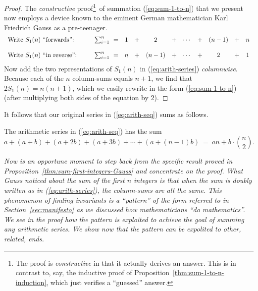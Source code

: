 \begin{proof}
The {\em constructive} proof\footnote{The proof is {\em constructive}
  in that it actually derives an answer.  This is in contrast to, say,
  the inductive proof of Proposition~\ref{thm:sum-1-to-n-induction},
  which just verifies a ``guessed'' answer.}~of summation
(\ref{eq:sum-1-to-n}) that we present now employs a device known to
the eminent German mathematician Karl Friedrich Gauss
as a pre-teenager.
\begin{equation}
\label{eq:arith-series}
\begin{array}{llccccccccc}
\mbox{Write $S_1(n)$ ``forwards'':} &
\hspace*{.25in}\sum_{i=1}^n \ = & 1 & + & 2   & + & \cdots & + & (n-1) & + & n \\
 & & & & & & & & & &  \\
\mbox{Write $S_1(n)$ ``in reverse'':} &
\hspace*{.25in}\sum_{i=1}^n \ = & n & + & (n-1) & + & \cdots & + & 2   & + & 1
\end{array}
\end{equation}
Now add the two representations of $S_1(n)$ in (\ref{eq:arith-series})
{\em columnwise}.  Because each of the $n$ column-sums equals $n+1$,
we find that $2 S_1(n) = n(n+1)$, which we easily rewrite in the form
(\ref{eq:sum-1-to-n}) (after multiplying both sides of the equation by
$2$).
\end{proof}

It follows that our original series in (\ref{eq:arith-seq}) sums as
follows.  
\begin{prop}
\label{thm:sum-of-arithmetic-series}
The arithmetic series in (\ref{eq:arith-seq}) has the sum
\[
a + (a+b) + (a+2b) + (a+3b) + \cdots + (a+(n-1)b) \ = \
an + b \cdot {n \choose 2}. 
\]
\end{prop}

\bigskip

{\em Now is an opportune moment to step back from the specific result
  proved in Proposition~\ref{thm:sum-first-integers-Gauss} and
  concentrate on the proof.  What Gauss noticed about the sum of the
  first $n$ integers is that when the sum is doubly written as in
  (\ref{eq:arith-series}), the column-sums are all the same.  This
  phenomenon of {\em finding invariants} is a ``pattern'' of the form
  referred to in Section~\ref{sec:manifesto} as we discussed how
  mathematicians ``do mathematics''.  We see in the proof how the
  pattern is exploited to achieve the goal of summing any arithmetic
  series.  We show now that the pattern can be expolited to other,
  related, ends.}

